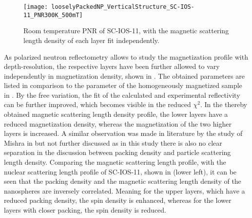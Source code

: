 \documentclass[\main/dresen_thesis.tex]{subfiles}
\begin{document}
  \begin{figure}[tb]
    \centering
    \texttt{[image: looselyPackedNP\_VerticalStructure\_SC-IOS-11\_PNR300K\_500mT]}
    \caption{\label{fig:looselyPackedNP:layer:pnrRoomTemperatureMagnetic}Room temperature PNR of SC-IOS-11, with the magnetic scattering length density of each layer fit independently.}
  \end{figure}
  As polarized neutron reflectometry allows to study the magnetization profile with depth-resolution, the respective layers have been further allowed to vary independently in magnetization density, shown in .
  The obtained parameters are listed in comparison to the parameter of the homogeneously magnetized sample in .
  By the free variation, the fit of the calculated and experimental reflectivity can be further improved, which becomes visible in the reduced $\chi^2$.
  In the thereby obtained magnetic scattering length density profile, the lower layers have a reduced magnetization density, whereas the magnetization of the two higher layers is increased.
  A similar observation was made in literature by the study of Mishra \etal in \cite{Mishra_2012_Selfa} but not further discussed as in this study there is also no clear separation in the discussion between packing density and particle scattering length density.
  Comparing the magnetic scattering length profile, with the nuclear scattering length profile of SC-IOS-11, shown in  (lower left), it can be seen that the packing density and the magnetic scattering length density of the nanospheres are inversely correlated.
  Meaning for the upper layers, which have a reduced packing density, the spin density is enhanced, whereas for the lower layers with closer packing, the spin density is reduced.
\end{document}
